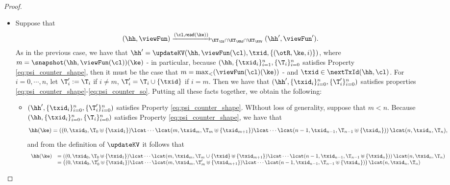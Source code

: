 \begin{proof}
\begin{itemize}
\item Suppose that 
\[
(\hh, \viewFun) \xrightarrow{(\cl, \mathsf{read}(\ke))}_{\ET_{\UA} \cap \ET_{\MRd} \cap \ET_{\RYW}} (\hh', \viewFun').
\]
As in the previous case, we have that $\hh' = \updateKV(\hh, \viewFun(\cl), \txid, \{(\otR, \ke, i)\})$, where 
$m = \snapshot(\hh, \viewFun(\cl))(\ke)$  - 
in particular, because $(\hh, \{\txid_{i}\}_{i=1}^{n}, \{\T_{i}\}_{i=0}^{n}$ satisfies 
Property \eqref{eq:psi_counter_shape}, then it must be the case that $m = \max_{<}(\viewFun(\cl)(\ke))$ - 
and $\txid \in \nextTxId(\hh, \cl)$. 
For $i=0,\cdots, n$, let $\T'_{i} := \T_{i}$ if $i \neq m$, $\T'_{i} = \T_{i} \cup \{\txid\}$ if 
$i = m$. Then we have that $(\hh', \{\txid_{i}\}_{i=0}^{n}, \{\T'_{i}\}_{i=0}^{n})$ satisfies 
properties \eqref{eq:psi_counter_shape}-\eqref{eq:psi_counter_so}.
Putting all these facts together, we obtain the following: 
\begin{itemize}
\item $(\hh', \{\txid_{i}\}_{i=0}^{n}, \{\T'_{i}\}_{i=0}^{n})$ satisfies Property \eqref{eq:psi_counter_shape}. 
WIthout loss of generality, suppose that $m < n$. 
Because $(\hh,  \{\txid_{i}\}_{i=0}^{n}, \{\T_{i}\}_{i=0}^{n})$ satisfies Property \eqref{eq:psi_counter_shape}, 
we have that 
\[
\hh(\ke) = \left( (0, \txid_{0}, \T_{0} \uplus \{\txid_1\}) \lcat \cdots \lcat (m, \txid_{m}, \T_{m} \uplus \{\txid_{m+1}\}) 
\lcat \cdots \lcat (n-1, \txid_{n-1}, \T_{n-1} \uplus \{\txid_{n}\}) \right) \lcat (n, \txid_{n}, \T_{n}),
\] 
and from the definition of $\updateKV$ it follows that 
\[
\begin{array}{ll}
\hh(\ke) &= \left( (0, \txid_{0}, \T_{0} \uplus \{\txid_1\}) \lcat \cdots \lcat (m, \txid_{m}, \T_{m} \cup \{\txid\} \uplus \{\txid_{m+1}\}) 
\lcat \cdots \lcat (n-1, \txid_{n-1}, \T_{n-1} \uplus \{\txid_{n}\}) \right) \lcat (n, \txid_{n}, \T_{n}) \\
& = \left( (0, \txid_{0}, \T'_{0} \uplus \{\txid_1\}) \lcat \cdots \lcat (m, \txid_{m}, \T'_{m} \uplus \{\txid_{m+1}\}) 
\lcat \cdots \lcat (n-1, \txid_{n-1}, \T_{n-1} \uplus \{\txid_{n}\}) \right) \lcat (n, \txid_{n}, \T_{n})
\end{array}
\]

\end{itemize}
\end{itemize}
\end{proof}
